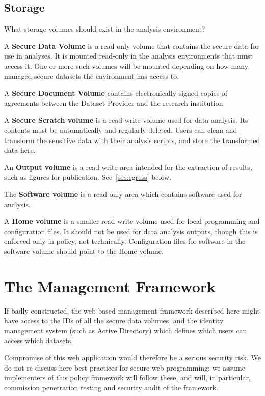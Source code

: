 \documentclass[10pt,a4paper,twocolumn]{article}
\begin{document}
\subsection{Storage}

What storage volumes should exist in the analysis environment?

A \textbf{Secure Data Volume} is a read-only volume that contains the secure data for use in analyses. It is mounted read-only
in the analysis environments that must access it. One or more such volumes will be mounted depending on how many managed secure datasets the environment has access to.

A \textbf{Secure Document Volume} contains electronically signed copies of agreements between the Dataset Provider and the
research institution.

A \textbf{Secure Scratch volume} is a read-write volume used for data analysis. Its contents must be automatically and regularly deleted. Users can clean and transform the sensitive data with their analysis scripts, and store the transformed data here.

An \textbf{Output volume} is a read-write area intended for the extraction of results, such as figures for publication. See~\ref{sec:egress} below.

The \textbf{Software volume} is a read-only area which contains software used for analysis. 

A \textbf{Home volume} is a smaller read-write volume used for local programming and configuration files. It should not be used for data analysis outputs, though this is enforced only in policy, not technically. Configuration files for software in the software volume should point to the Home volume.

\section{The Management Framework}

If badly constructed, the web-based management framework described here might have access to the IDs of all the secure data volumes, and the identity management system (such as Active Directory) which defines which users can access which datasets.

Compromise of this web application would therefore be a serious security risk. We do not re-discuss here best practices for secure web programming: we assume implementers of this policy framework will follow these, and will, in particular, commission penetration testing and security audit of the framework.
\end{document}
